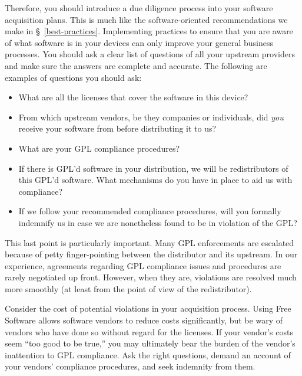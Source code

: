 Therefore, you should introduce a due diligence process into your software
acquisition plans.  This is much like the software-oriented
recommendations we make in \S~\ref{best-practices}.  Implementing
practices to ensure that you are aware of what software is in your devices
can only improve your general business processes.  You should ask a clear
list of questions of all your upstream providers and make sure the answers
are complete and accurate.  The following are examples of questions you
should ask:
\begin{itemize}

\item What are all the licenses that cover the software in this device?

\item From which upstream vendors, be they companies or individuals, did
  \emph{you} receive your software from before distributing it to us?

\item What are your GPL compliance procedures?

\item If there is GPL'd software in your distribution, we will be
  redistributors of this GPL'd software.  What mechanisms do you have in
  place to aid us with compliance?

\item If we follow your recommended compliance procedures, will you
  formally indemnify us in case we are nonetheless found to be in
  violation of the GPL?

\end{itemize}

This last point is particularly important.  Many GPL enforcements are
escalated because of petty finger-pointing between the distributor and its
upstream.  In our experience, agreements regarding GPL compliance issues
and procedures are rarely negotiated up front.  However, when they are,
violations are resolved much more smoothly (at least from the point of
view of the redistributor).

Consider the cost of potential violations in your acquisition process.
Using Free Software allows software vendors to reduce costs significantly, but be
wary of vendors who have done so without regard for the licenses.  If your
vendor's costs seem ``too good to be true,'' you may ultimately bear the
burden of the vendor's inattention to GPL compliance.  Ask the right
questions, demand an account of your vendors' compliance procedures, and
seek indemnity from them.

